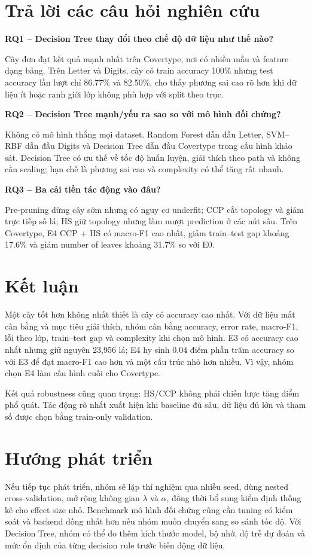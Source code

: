 
\section{Trả lời các câu hỏi nghiên cứu}

\noindent\textbf{RQ1 -- Decision Tree thay đổi theo chế độ dữ liệu như thế nào?}\par
Cây đơn đạt kết quả mạnh nhất trên Covertype, nơi có nhiều mẫu và feature dạng bảng. Trên Letter và Digits, cây có train accuracy 100\% nhưng test accuracy lần lượt chỉ 86.77\% và 82.50\%, cho thấy phương sai cao rõ hơn khi dữ liệu ít hoặc ranh giới lớp không phù hợp với split theo trục.

\noindent\textbf{RQ2 -- Decision Tree mạnh/yếu ra sao so với mô hình đối chứng?}\par
Không có mô hình thắng mọi dataset. Random Forest dẫn đầu Letter, SVM--RBF dẫn đầu Digits và Decision Tree dẫn đầu Covertype trong cấu hình khảo sát. Decision Tree có ưu thế về tốc độ huấn luyện, giải thích theo path và không cần scaling; hạn chế là phương sai cao và complexity có thể tăng rất nhanh.

\noindent\textbf{RQ3 -- Ba cải tiến tác động vào đâu?}\par
Pre-pruning dừng cây sớm nhưng có nguy cơ underfit; CCP cắt topology và giảm trực tiếp số lá; HS giữ topology nhưng làm mượt prediction ở các nút sâu. Trên Covertype, E4 CCP + HS có macro-F1 cao nhất, giảm train--test gap khoảng 17.6\% và giảm number of leaves khoảng 31.7\% so với E0.

\section{Kết luận}

Một cây tốt hơn không nhất thiết là cây có accuracy cao nhất. Với dữ liệu mất cân bằng và mục tiêu giải thích, nhóm cân bằng accuracy, error rate, macro-F1, lỗi theo lớp, train--test gap và complexity khi chọn mô hình. E3 có accuracy cao nhất nhưng giữ nguyên 23,956 lá; E4 hy sinh 0.04 điểm phần trăm accuracy so với E3 để đạt macro-F1 cao hơn và một cấu trúc nhỏ hơn nhiều. Vì vậy, nhóm chọn E4 làm cấu hình cuối cho Covertype.

Kết quả robustness cũng quan trọng: HS/CCP không phải chiến lược tăng điểm phổ quát. Tác động rõ nhất xuất hiện khi baseline đủ sâu, dữ liệu đủ lớn và tham số được chọn bằng train-only validation.

\section{Hướng phát triển}

Nếu tiếp tục phát triển, nhóm sẽ lặp thí nghiệm qua nhiều seed, dùng nested cross-validation, mở rộng không gian $\lambda$ và $\alpha$, đồng thời bổ sung kiểm định thống kê cho effect size nhỏ. Benchmark mô hình đối chứng cũng cần tuning có kiểm soát và backend đồng nhất hơn nếu nhóm muốn chuyển sang so sánh tốc độ. Với Decision Tree, nhóm có thể đo thêm kích thước model, bộ nhớ, độ trễ dự đoán và mức ổn định của từng decision rule trước biến động dữ liệu.
